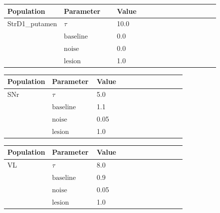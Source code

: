 \documentclass{article}
\begin{document}
\noindent
\begin{tabularx}{\linewidth}{|p{0.25\linewidth}|p{0.25\linewidth}|X|}\hline
\textbf{Population} & \textbf{Parameter} & \textbf{Value}   \\ \hline

    StrD1\_putamen             & $\tau$        & 10.0  \\ \hline

                 & ${\text{baseline}}$        & 0.0  \\ \hline

                 & ${\text{noise}}$        & 0.0  \\ \hline

                 & ${\text{lesion}}$        & 1.0  \\ \hline

\end{tabularx}

\vspace{2ex}

\noindent
\begin{tabularx}{\linewidth}{|p{0.25\linewidth}|p{0.25\linewidth}|X|}\hline
\textbf{Population} & \textbf{Parameter} & \textbf{Value}   \\ \hline

    SNr             & $\tau$        & 5.0  \\ \hline

                 & ${\text{baseline}}$        & 1.1  \\ \hline

                 & ${\text{noise}}$        & 0.05  \\ \hline

                 & ${\text{lesion}}$        & 1.0  \\ \hline

\end{tabularx}

\vspace{2ex}

\noindent
\begin{tabularx}{\linewidth}{|p{0.25\linewidth}|p{0.25\linewidth}|X|}\hline
\textbf{Population} & \textbf{Parameter} & \textbf{Value}   \\ \hline

    VL             & $\tau$        & 8.0  \\ \hline

                 & ${\text{baseline}}$        & 0.9  \\ \hline

                 & ${\text{noise}}$        & 0.05  \\ \hline

                 & ${\text{lesion}}$        & 1.0  \\ \hline

\end{tabularx}
\end{document}
